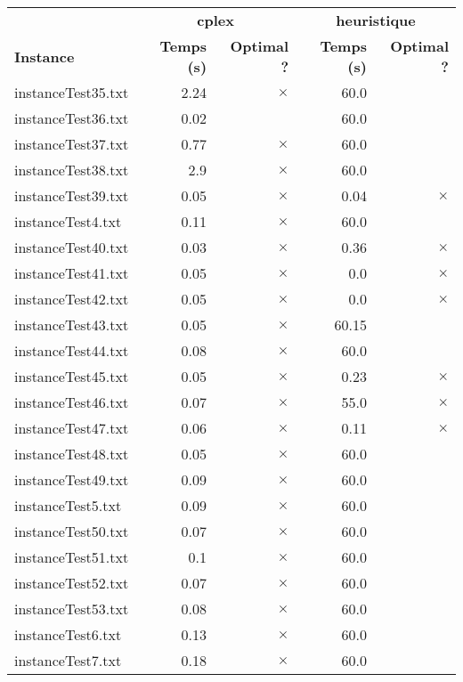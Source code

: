 \documentclass{article}
\begin{document}
\newpage
\begin{center}
\renewcommand{\arraystretch}{1.4} 
 \begin{tabular}{lrrrr}
	\hline
 & \multicolumn{2}{c}{\textbf{cplex}} & \multicolumn{2}{c}{\textbf{heuristique}}\\
\textbf{Instance}  & \textbf{Temps (s)} & \textbf{Optimal ?}  & \textbf{Temps (s)} & \textbf{Optimal ?} \\\hline

instanceTest35.txt & 2.24 & 
$\times$
 & 60.0 & 
\\
instanceTest36.txt & 0.02 & 
 & 60.0 & 
\\
instanceTest37.txt & 0.77 & 
$\times$
 & 60.0 & 
\\
instanceTest38.txt & 2.9 & 
$\times$
 & 60.0 & 
\\
instanceTest39.txt & 0.05 & 
$\times$
 & 0.04 & 
$\times$
\\
instanceTest4.txt & 0.11 & 
$\times$
 & 60.0 & 
\\
instanceTest40.txt & 0.03 & 
$\times$
 & 0.36 & 
$\times$
\\
instanceTest41.txt & 0.05 & 
$\times$
 & 0.0 & 
$\times$
\\
instanceTest42.txt & 0.05 & 
$\times$
 & 0.0 & 
$\times$
\\
instanceTest43.txt & 0.05 & 
$\times$
 & 60.15 & 
\\
instanceTest44.txt & 0.08 & 
$\times$
 & 60.0 & 
\\
instanceTest45.txt & 0.05 & 
$\times$
 & 0.23 & 
$\times$
\\
instanceTest46.txt & 0.07 & 
$\times$
 & 55.0 & 
$\times$
\\
instanceTest47.txt & 0.06 & 
$\times$
 & 0.11 & 
$\times$
\\
instanceTest48.txt & 0.05 & 
$\times$
 & 60.0 & 
\\
instanceTest49.txt & 0.09 & 
$\times$
 & 60.0 & 
\\
instanceTest5.txt & 0.09 & 
$\times$
 & 60.0 & 
\\
instanceTest50.txt & 0.07 & 
$\times$
 & 60.0 & 
\\
instanceTest51.txt & 0.1 & 
$\times$
 & 60.0 & 
\\
instanceTest52.txt & 0.07 & 
$\times$
 & 60.0 & 
\\
instanceTest53.txt & 0.08 & 
$\times$
 & 60.0 & 
\\
instanceTest6.txt & 0.13 & 
$\times$
 & 60.0 & 
\\
instanceTest7.txt & 0.18 & 
$\times$
 & 60.0 & 

\end{tabular}
\end{center}
\end{document}
